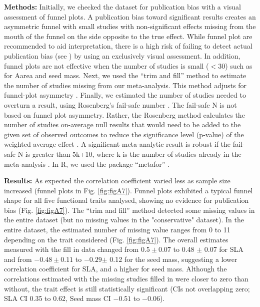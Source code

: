 \documentclass[10pt,twoside]{article}\usepackage[]{graphicx}\usepackage[]{color}
\begin{document}
\noindent\textbf{Methods:} Initially, we checked the dataset for publication bias with a visual assessment of funnel plots. A publication bias toward significant results creates an asymmetric funnel with small studies with non-significant effects missing from the mouth of the funnel on the side opposite to the true effect. While funnel plot are recommended to aid interpretation, there is a high risk of failing to detect actual publication bias (see \citealt{Koricheva:2013tz}) by using an exclusively visual assessment. In addition, funnel plots are not effective when the number of studies is small ($<30$) such as for Aarea and seed mass.
Next, we used the ``trim and fill'' method to estimate the number of studies missing from our meta-analysis. This method adjusts for funnel-plot asymmetry \citep{Duval:2000dg}.
Finally, we estimated the number of studies needed to overturn a result, using Rosenberg's fail-safe number \citep{Rosenberg:2005hk}. The fail-safe N is not based on funnel plot asymmetry. Rather, the Rosenberg method calculates the number of studies on-average null results that would need to be added to the given set of observed outcomes to reduce the significance level (p-value) of the weighted average effect \citep{Rosenberg:2005hk}. A significant meta-analytic result is robust if the fail-safe N is greater than 5k+10, where k is the number of studies already in the meta-analysis \citep{Rosenthal:1979do}.
In R, we used the package ``metafor''  \citep{Viechtbauer-2010}.

\noindent\textbf{Results:} As expected the correlation coefficient varied less as sample size increased (funnel plots in Fig. \ref{fig:figA7}). Funnel plots exhibited a typical funnel shape for all five functional traits analysed, showing no evidence for publication bias (Fig. \ref{fig:figA7}).
The ``trim and fill'' method detected some missing values in the entire dataset (but no missing values in the "conservative" dataset). In the entire dataset, the estimated number of missing value ranges from 0 to 11 depending on the trait considered (Fig. \ref{fig:figA7}). The overall estimates measured with the fill in data changed from $0.5 \pm 0.07$ to 0.48 $\pm$ 0.07 for SLA and from $-0.48 \pm 0.11$ to \ensuremath{-0.29}$\pm$ 0.12 for the seed mass, suggesting a lower correlation coefficient for SLA, and a higher for seed mass. Although the correlations estimated with the missing studies filled in were closer to zero than without, the trait effect is still statistically significant (CIs not overlapping zero; SLA CI 0.35 to 0.62, Seed mass CI \ensuremath{-0.51} to \ensuremath{-0.06}).
\end{document}
